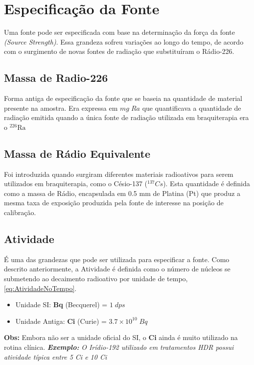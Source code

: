 \documentclass[11pt,a4paper]{article}
\begin{document}
	\section{Especificação da Fonte}
		
		Uma fonte pode ser especificada com base na determinação da força da fonte \textit{(Source Strength)}. Essa grandeza sofreu variações ao longo do tempo, de acordo com o surgimento de novas fontes de radiação que substituíram o Rádio-226. 

		\subsection{Massa de Radio-226}

			Forma antiga de especificação da fonte que se baseia na quantidade de material presente na amostra. Era expressa em $mg\; Ra$ que quantificava a quantidade de radiação emitida quando a única fonte de radiação utilizada em braquiterapia era o $\mathrm{{}^{226}Ra}$

		\subsection{Massa de Rádio Equivalente}

			Foi introduzida quando surgiram diferentes materiais radioativos para serem utilizados em braquiterapia, como o Césio-137 (${}^{137}Cs$). Esta quantidade é definida como a massa de Rádio, encapsulada em 0.5 mm de Platina (Pt) que produz a mesma taxa de exposição produzida pela fonte de interesse na posição de calibração.

		\subsection{Atividade}

			É uma das grandezas que pode ser utilizada para especificar a fonte. Como descrito anteriormente, a Atividade é definida como o número de núcleos se submetendo ao decaimento radioativo por unidade de tempo,   \ref{eq:AtividadeNoTempo}.

			\begin{itemize}
				\item Unidade SI: \textbf{Bq} (Becquerel) = $1\;dps$
				\item Unidade Antiga: \textbf{Ci} (Curie) = $3.7 \times 10^{10}\; Bq$
			\end{itemize}

			\textbf{\textbf{\textcolor{CarnationPink}{Obs:} } }Embora não ser a unidade oficial do SI, o \textbf{Ci} ainda é muito utilizado na rotina clínica. \textit{\textbf{\textcolor{CarnationPink}{Exemplo:}}} \textit{O Irídio-192 utilizado em tratamentos HDR possui atividade típica entre 5 Ci e 10 Ci}
\end{document}
